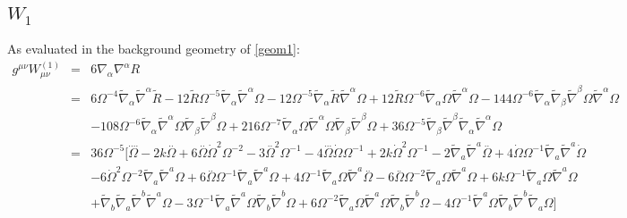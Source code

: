 \documentclass[10pt,letterpaper]{article}
\numberwithin{equation}{section}
\begin{document}
\subsection{$W_1$}
As evaluated in the background geometry of \eqref{geom1}:
\begin{eqnarray}
g^{\mu\nu}W_{\mu\nu}^{(1)}&=& 6 \nabla_{\alpha }\nabla^{\alpha }R
\nonumber\\
&=& 
6 \Omega^{-4} \tilde \nabla_{\alpha }\tilde \nabla^{\alpha }\tilde R - 12 \tilde R \Omega^{-5} \tilde \nabla_{\alpha }\tilde \nabla^{\alpha }\Omega - 12 \Omega^{-5} \tilde \nabla_{\alpha }\tilde R \tilde \nabla^{\alpha }\Omega + 12 \tilde R \Omega^{-6} \tilde \nabla_{\alpha }\Omega \tilde \nabla^{\alpha }\Omega- 144 \Omega^{-6} \tilde \nabla_{\alpha }\tilde \nabla_{\beta }\tilde \nabla^{\beta }\Omega \tilde \nabla^{\alpha }\Omega\nonumber\\
&&  - 108 \Omega^{-6} \tilde \nabla_{\alpha }\tilde \nabla^{\alpha }\Omega \tilde \nabla_{\beta }\tilde \nabla^{\beta }\Omega + 216 \Omega^{-7} \tilde \nabla_{\alpha }\Omega \tilde \nabla^{\alpha }\Omega \tilde \nabla_{\beta }\tilde \nabla^{\beta }\Omega + 36 \Omega^{-5} \tilde \nabla_{\beta }\tilde \nabla^{\beta }\tilde \nabla_{\alpha }\tilde \nabla^{\alpha }\Omega
\nonumber\\
&=&36\Omega^{-5}\bigg[ \overset{....}{\Omega} - 2 k \overset{..}{\Omega} + 6 \overset{..}{\Omega} \dot{\Omega}^2 \Omega^{-2} - 3 \overset{..}{\Omega}^2 \Omega^{-1} - 4 \overset{...}{\Omega} \dot{\Omega} \Omega^{-1} + 2 k \dot{\Omega}^2 \Omega^{-1} - 2 \tilde{\nabla}_{a}\tilde{\nabla}^{a}\overset{..}{\Omega} + 4 \dot{\Omega} \Omega^{-1} \tilde{\nabla}_{a}\tilde{\nabla}^{a}\dot{\Omega} \nonumber \\ 
&& - 6 \dot{\Omega}^2 \Omega^{-2} \tilde{\nabla}_{a}\tilde{\nabla}^{a}\Omega + 6 \overset{..}{\Omega} \Omega^{-1} \tilde{\nabla}_{a}\tilde{\nabla}^{a}\Omega + 4 \Omega^{-1} \tilde{\nabla}_{a}\Omega \tilde{\nabla}^{a}\overset{..}{\Omega} - 6 \overset{..}{\Omega} \Omega^{-2} \tilde{\nabla}_{a}\Omega \tilde{\nabla}^{a}\Omega + 6 k \Omega^{-1} \tilde{\nabla}_{a}\Omega \tilde{\nabla}^{a}\Omega \nonumber \\ 
&& + \tilde{\nabla}_{b}\tilde{\nabla}_{a}\tilde{\nabla}^{b}\tilde{\nabla}^{a}\Omega - 3 \Omega^{-1} \tilde{\nabla}_{a}\tilde{\nabla}^{a}\Omega \tilde{\nabla}_{b}\tilde{\nabla}^{b}\Omega + 6 \Omega^{-2} \tilde{\nabla}_{a}\Omega \tilde{\nabla}^{a}\Omega \tilde{\nabla}_{b}\tilde{\nabla}^{b}\Omega - 4 \Omega^{-1} \tilde{\nabla}^{a}\Omega \tilde{\nabla}_{b}\tilde{\nabla}^{b}\tilde{\nabla}_{a}\Omega \bigg]
\label{W1tr}
\end{eqnarray}
\end{document}
